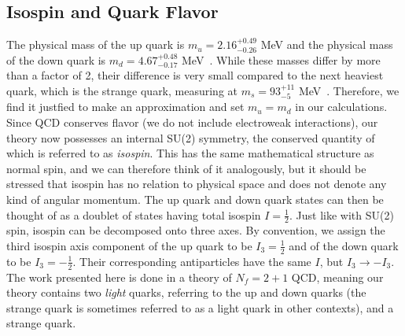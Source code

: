    \subsection{Isospin and Quark Flavor}
    The physical mass of the up quark is $m_u = 2.16^{+0.49}_{-0.26}$ MeV and the physical mass of the down quark is $m_d = 4.67^{+0.48}_{-0.17}$ MeV~\cite{PhysRevD.98.030001}. While these masses differ by more than a factor of 2, their difference is very small compared to the next heaviest quark, which is the strange quark, measuring at $m_s = 93^{+11}_{-5}$ MeV~\cite{PhysRevD.98.030001}. Therefore, we find it justfied to make an approximation and set $m_u = m_d$ in our calculations. Since QCD conserves flavor (we do not include electroweak interactions), our theory now possesses an internal SU(2) symmetry, the conserved quantity of which is referred to as \emph{isospin}. This has the same mathematical structure as normal spin, and we can therefore think of it analogously, but it should be stressed that isospin has no relation to physical space and does not denote any kind of angular momentum. The up quark and down quark states can then be thought of as a doublet of states having total isospin $I=\frac{1}{2}$. Just like with SU(2) spin, isospin can be decomposed onto three axes. By convention, we assign the third isospin axis component of the up quark to be $I_3 = \frac{1}{2}$ and of the down quark to be $I_3 = -\frac{1}{2}$. Their corresponding antiparticles have the same $I$, but $I_3\rightarrow -I_3$. The work presented here is done in a theory of $N_f = 2 + 1$ QCD, meaning our theory contains two \emph{light} quarks, referring to the up and down quarks (the strange quark is sometimes referred to as a light quark in other contexts), and a strange quark.
    
